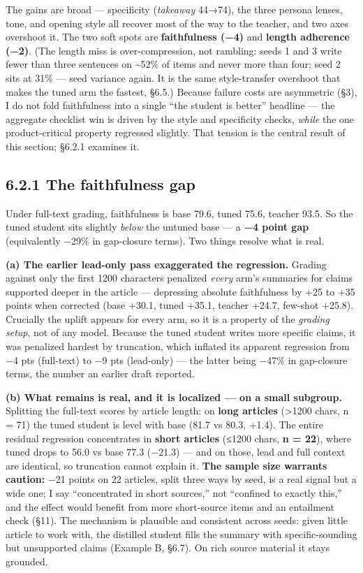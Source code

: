 \documentclass[11pt]{article}
\begin{document}
The gains are broad --- specificity (\emph{takeaway} 44→74), the three
persona lenses, tone, and opening style all recover most of the way to
the teacher, and two axes overshoot it. The two soft spots are
\textbf{faithfulness (−4)} and \textbf{length adherence (−2)}. (The
length miss is over-compression, not rambling: seeds 1 and 3 write fewer
than three sentences on \textasciitilde52\% of items and never more than
four; seed 2 sits at 31\% --- seed variance again. It is the same
style-transfer overshoot that makes the tuned arm the fastest, §6.5.)
Because failure costs are asymmetric (§3), I do not fold faithfulness
into a single ``the student is better'' headline --- the aggregate
checklist win is driven by the style and specificity checks,
\emph{while} the one product-critical property regressed slightly. That
tension is the central result of this section; §6.2.1 examines it.

\subsection{6.2.1 The faithfulness gap}\label{the-faithfulness-gap}

Under full-text grading, faithfulness is base 79.6, tuned 75.6, teacher
93.5. So the tuned student sits slightly \emph{below} the untuned base
--- a \textbf{−4 point gap} (equivalently −29\% in gap-closure terms).
Two things resolve what is real.

\textbf{(a) The earlier lead-only pass exaggerated the regression.}
Grading against only the first 1200 characters penalized \emph{every}
arm's summaries for claims supported deeper in the article ---
depressing absolute faithfulness by +25 to +35 points when corrected
(base +30.1, tuned +35.1, teacher +24.7, few-shot +25.8). Crucially the
uplift appears for every arm, so it is a property of the \emph{grading
setup}, not of any model. Because the tuned student writes more specific
claims, it was penalized hardest by truncation, which inflated its
apparent regression from −4 pts (full-text) to −9 pts (lead-only) ---
the latter being −47\% in gap-closure terms, the number an earlier draft
reported.

\textbf{(b) What remains is real, and it is localized --- on a small
subgroup.} Splitting the full-text scores by article length: on
\textbf{long articles} (\textgreater1200 chars, n = 71) the tuned
student is level with base (81.7 vs 80.3, +1.4). The entire residual
regression concentrates in \textbf{short articles} (≤1200 chars,
\textbf{n = 22}), where tuned drops to 56.0 vs base 77.3 (−21.3) --- and
on those, lead and full context are identical, so truncation cannot
explain it. \textbf{The sample size warrants caution:} −21 points on 22
articles, split three ways by seed, is a real signal but a wide one; I
say ``concentrated in short sources,'' not ``confined to exactly this,''
and the effect would benefit from more short-source items and an
entailment check (§11). The mechanism is plausible and consistent across
seeds: given little article to work with, the distilled student fills
the summary with specific-sounding but unsupported claims (Example B,
§6.7). On rich source material it stays grounded.
\end{document}
